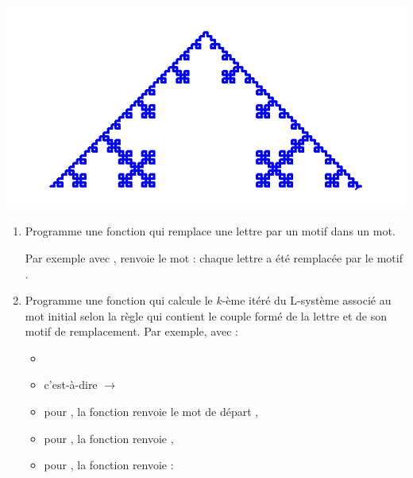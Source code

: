 \documentclass[11pt,class=report,crop=false]{standalone}
\begin{document}
\begin{activite}



\begin{center}
\includegraphics[scale=\myscale,scale=0.4]{ecran-lsysteme-2}
\end{center}

\begin{enumerate}
  \item Programme une fonction  qui remplace une lettre par un motif dans un mot. 

Par exemple avec ,  renvoie le mot  : chaque lettre  a été remplacée par le motif .
 
  \item Programme une fonction 
  qui calcule le $k$-ème itéré du L-système associé au mot initial  selon la règle  qui contient le couple formé de la lettre et de son motif de remplacement.
  Par exemple, avec :
  \begin{itemize}
    \item {}
    \item {} c'est-à-dire  $\rightarrow$ 
    \item pour , la fonction renvoie le mot de départ ,
    \item pour , la fonction renvoie ,
    \item pour , la fonction renvoie :  
     

\end{itemize}
\end{enumerate}
\end{activite}
\end{document}

